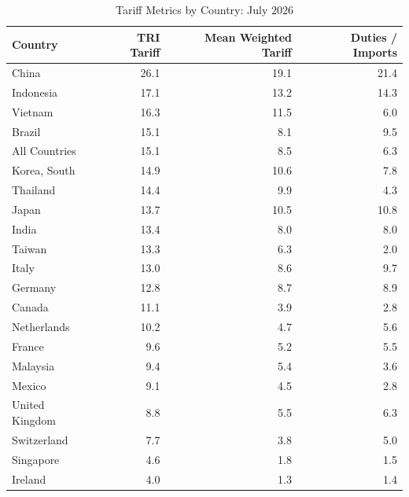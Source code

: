 \begin{table}
\centering
\caption{Tariff Metrics by Country: July 2026}
\label{tab:tariff_metrics}
\begin{tabular}{lrrr}
\toprule
Country & TRI Tariff & Mean Weighted Tariff & Duties / Imports \\
\midrule
China & 26.1 & 19.1 & 21.4 \\
Indonesia & 17.1 & 13.2 & 14.3 \\
Vietnam & 16.3 & 11.5 & 6.0 \\
Brazil & 15.1 & 8.1 & 9.5 \\
All Countries & 15.1 & 8.5 & 6.3 \\
Korea, South & 14.9 & 10.6 & 7.8 \\
Thailand & 14.4 & 9.9 & 4.3 \\
Japan & 13.7 & 10.5 & 10.8 \\
India & 13.4 & 8.0 & 8.0 \\
Taiwan & 13.3 & 6.3 & 2.0 \\
Italy & 13.0 & 8.6 & 9.7 \\
Germany & 12.8 & 8.7 & 8.9 \\
Canada & 11.1 & 3.9 & 2.8 \\
Netherlands & 10.2 & 4.7 & 5.6 \\
France & 9.6 & 5.2 & 5.5 \\
Malaysia & 9.4 & 5.4 & 3.6 \\
Mexico & 9.1 & 4.5 & 2.8 \\
United Kingdom & 8.8 & 5.5 & 6.3 \\
Switzerland & 7.7 & 3.8 & 5.0 \\
Singapore & 4.6 & 1.8 & 1.5 \\
Ireland & 4.0 & 1.3 & 1.4 \\
\bottomrule
\end{tabular}
\end{table}

